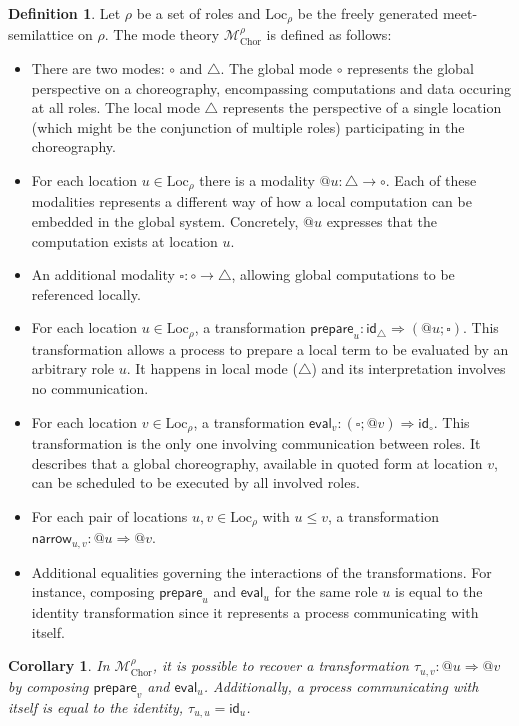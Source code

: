 \documentclass{scrartcl}
\theoremstyle{definition}
\newtheorem{definition}{Definition}
\theoremstyle{plain}
\newtheorem{corollary}{Corollary}
\begin{document}
\begin{definition}
Let $\rho$ be a set of roles and $\textrm{Loc}_\rho$ be the freely generated
meet-semilattice on $\rho$. The mode theory
$\mathcal{M}^\rho_{\textrm{Chor}}$ is defined as follows:

\begin{itemize}
\item There are two modes: $\circ$ and
  $\triangle$. The global mode $\circ$ represents the
  global perspective on a choreography, encompassing computations and data
  occuring at all roles. The local mode $\triangle$
  represents the perspective of a single location (which might be the
  conjunction of multiple roles) participating in the choreography.
\item For each location $u \in \textrm{Loc}_\rho$ there is a modality $@u : \triangle \to
  \circ$. Each of these modalities represents a different way of how a local
  computation can be embedded in the global system. Concretely, $@u$ expresses
  that the computation exists at location $u$.
\item An additional modality $\square : \circ \to \triangle$, allowing global
  computations to be referenced locally.
\item For each location $u \in \textrm{Loc}_\rho$, a transformation
  $\textsf{prepare}_u : \textsf{id}_\triangle \Rightarrow ({}@ u ;
  \square)$. This transformation allows a process to prepare a local term to be evaluated by an
  arbitrary role $u$. It happens in local mode ($\triangle$) and its
  interpretation involves no communication.
\item For each location $v \in \textrm{Loc}_\rho$, a transformation
  $\textsf{eval}_v : (\square ; {}@ v) \Rightarrow \textsf{id}_\circ$. This
  transformation is the only one involving communication between roles. It
  describes that a global choreography, available in quoted form at location
  $v$, can be scheduled to be executed by all involved roles.
\item For each pair of locations $u, v \in \textrm{Loc}_\rho$ with $u \leq v$, a
  transformation $\textsf{narrow}_{u,v} : @u \Rightarrow @v$.
\item Additional equalities governing the interactions of the transformations.
  For instance, composing $\textsf{prepare}_u$ and $\textsf{eval}_u$ for
  the same role $u$ is equal to the identity transformation since it represents
  a process communicating with itself.
\end{itemize}
\end{definition}
\begin{corollary}
  In {\upshape$\mathcal{M}^{\rho}_{\textrm{Chor}}$}, it is possible to recover a transformation
  $\tau_{u,v} : @u \Rightarrow @v$ by composing {\upshape$\textsf{prepare}_v$}
  and {\upshape$\textsf{eval}_u$}. Additionally, a process communicating with
  itself is equal to the identity, {\upshape$\tau_{u,u} = \textsf{id}_u$}.
\end{corollary}
\end{document}
